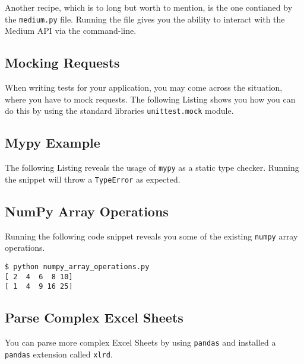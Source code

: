 Another recipe, which is to long but worth to mention, is the one contianed by the \lstinline{medium.py} file.
Running the file gives you the ability to interact with the Medium API via the command-line.


\subsection{Mocking Requests}

When writing tests for your application, you may come across the situation, where you have to mock requests.
The following Listing shows you how you can do this by using the standard libraries \lstinline{unittest.mock} module.




\subsection{Mypy Example}

The following Listing reveals the usage of \lstinline{mypy} as a static type checker.
Running the snippet will throw a \lstinline{TypeError} as expected.




\subsection{NumPy Array Operations}

Running the following code snippet reveals you some of the existing \lstinline{numpy} array operations.



\begin{lstlisting}[caption=Output of numpy\_array\_operations.py]
$ python numpy_array_operations.py
[ 2  4  6  8 10]
[ 1  4  9 16 25]
\end{lstlisting}


\subsection{Parse Complex Excel Sheets}

You can parse more complex Excel Sheets by using \lstinline{pandas} and installed a \lstinline{pandas} extension called \lstinline{xlrd}.

